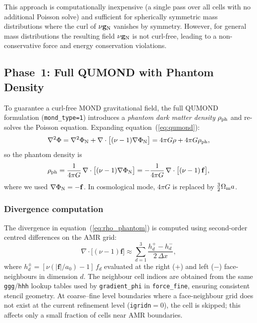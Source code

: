 \documentclass[fleqn,usenatbib]{mnras}
\newcommand{\code}[1]{\texttt{#1}}
\newcommand{\Om}{\Omega_{\rm m}}
\newcommand{\azero}{a_0}
\newcommand{\gN}{\mathbf{g}_{\rm N}}
\newcommand{\rhoph}{\rho_{\rm ph}}
\begin{document}
This approach is computationally inexpensive (a single pass over all
cells with no additional Poisson solve) and sufficient for
spherically symmetric mass distributions where the curl of $\nu\gN$
vanishes by symmetry.  However, for general mass distributions the
resulting field $\nu\gN$ is not curl-free, leading to a
non-conservative force and energy conservation violations.

\subsection{Phase~1: Full QUMOND with Phantom Density}
\label{sec:mond_phase1}

To guarantee a curl-free MOND gravitational field, the full QUMOND
formulation (\code{mond\_type=1}) introduces a \emph{phantom dark
matter density} $\rhoph$ and re-solves the Poisson equation.  Expanding
equation~(\ref{eq:qumond}):
\begin{equation}
\nabla^2 \Phi = \nabla^2 \Phi_{\rm N} + \nabla\cdot\bigl[(\nu-1)
\nabla\Phi_{\rm N}\bigr]
= 4\pi G\rho + 4\pi G\rhoph,
\label{eq:phantom_split}
\end{equation}
so the phantom density is
\begin{equation}
\rhoph = \frac{1}{4\pi G}\,\nabla\cdot\bigl[(\nu-1)
\nabla\Phi_{\rm N}\bigr]
= -\frac{1}{4\pi G}\,\nabla\cdot\bigl[(\nu-1)\,\mathbf{f}\bigr],
\label{eq:rho_phantom}
\end{equation}
where we used $\nabla\Phi_{\rm N} = -\mathbf{f}$.  In cosmological
mode, $4\pi G$ is replaced by $\tfrac{3}{2}\Om a$.

\subsubsection{Divergence computation}

The divergence in equation~(\ref{eq:rho_phantom}) is computed using
second-order centred differences on the AMR grid:
\begin{equation}
\nabla\cdot\bigl[(\nu-1)\mathbf{f}\bigr] \approx
\sum_{d=1}^{3} \frac{h_d^{+} - h_d^{-}}{2\,\Delta x},
\label{eq:div_fd}
\end{equation}
where $h_d^{\pm} = [\nu(|\mathbf{f}|/\azero) - 1]\,f_d$ evaluated at
the right ($+$) and left ($-$) face-neighbours in dimension $d$.  The
neighbour cell indices are obtained from the same \code{ggg}/\code{hhh}
lookup tables used by \code{gradient\_phi} in \code{force\_fine},
ensuring consistent stencil geometry.  At coarse--fine level boundaries
where a face-neighbour grid does not exist at the current refinement
level (\code{igridn}${}=0$), the cell is skipped; this affects only a
small fraction of cells near AMR boundaries.
\end{document}
